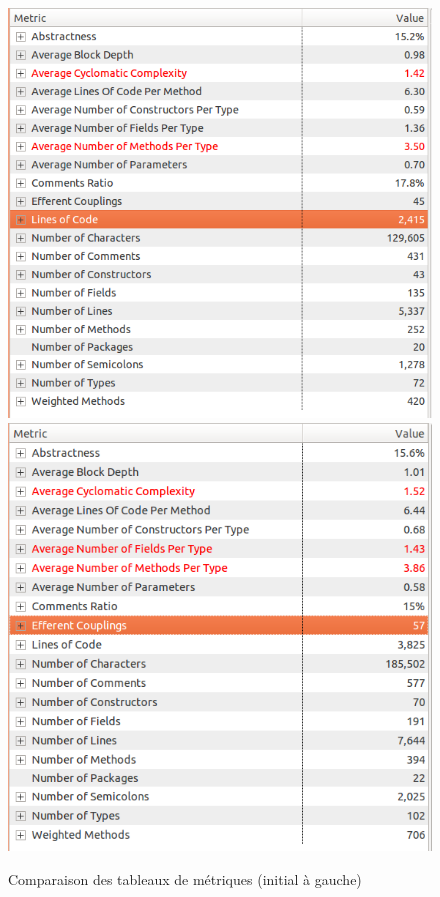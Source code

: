 \documentclass[a4paper,12pt]{report} %
\begin{document}
\begin{figure}[!h]
\includegraphics[scale=0.45]{ressources/final_initial_metrics}\includegraphics[scale=0.45]{ressources/final_new_metrics}\caption{Comparaison des tableaux de métriques (initial à gauche)}\label{figure6}


\end{figure}
\end{document}
